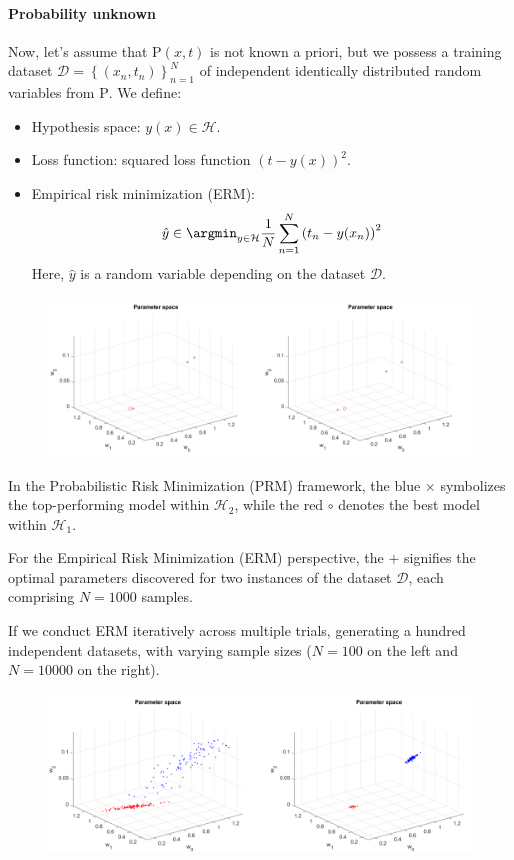 \paragraph*{Probability unknown}
Now, let's assume that $\text{P}(x,t)$  is not known a priori, but we possess a training dataset $\mathcal{D}={\left\{ (x_n,t_n) \right\}}_{n=1}^N$ of independent identically distributed random variables from $\text{P}$.
We define: 
\begin{itemize}
    \item Hypothesis space: $y(x) \in\mathcal{H}$. 
    \item Loss function: squared loss function ${(t-y(x))}^2$. 
    \item Empirical risk minimization (ERM):
        \[\hat{y}\in\argmin_{y \in \mathcal{H}}\dfrac{1}{N}\sum_{n=1}^{N}{\left( t_n-y(x_n)\right)}^2\]
        Here, $\hat{y}$ is a random variable depending on the dataset $\mathcal{D}$. 
\end{itemize}
\begin{figure}[H]
    \centering
    \includegraphics[width=0.75\linewidth]{images/bias1.png}
\end{figure}
In the Probabilistic Risk Minimization (PRM) framework, the blue $\times$ symbolizes the top-performing model within $\mathcal{H}_2$, while the red $\circ$ denotes the best model within $\mathcal{H}_1$.

For the Empirical Risk Minimization (ERM) perspective, the $+$ signifies the optimal parameters discovered for two instances of the dataset $\mathcal{D}$, each comprising $N = 1000$ samples.

If we conduct ERM iteratively across multiple trials, generating a hundred independent datasets, with varying sample sizes ($N = 100$ on the left and $N = 10000$ on the right).
\begin{figure}[H]
    \centering
    \includegraphics[width=0.75\linewidth]{images/bias2.png}
\end{figure}

